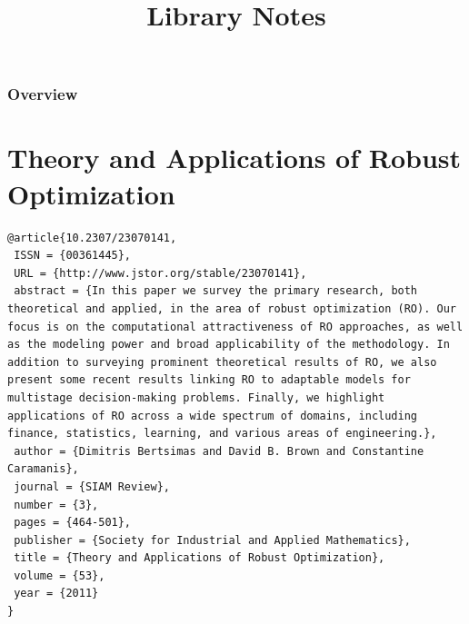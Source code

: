 \documentclass{beamer}
\title[Short title]{Library Notes}
\begin{document}
\begin{frame}
\titlepage
\end{frame}

\begin{frame}
\frametitle{Overview}
\tableofcontents
\end{frame}


\section{Theory and Applications of Robust Optimization}

\begin{frame}[fragile]
\begin{verbatim}
@article{10.2307/23070141,
 ISSN = {00361445},
 URL = {http://www.jstor.org/stable/23070141},
 abstract = {In this paper we survey the primary research, both theoretical and applied, in the area of robust optimization (RO). Our focus is on the computational attractiveness of RO approaches, as well as the modeling power and broad applicability of the methodology. In addition to surveying prominent theoretical results of RO, we also present some recent results linking RO to adaptable models for multistage decision-making problems. Finally, we highlight applications of RO across a wide spectrum of domains, including finance, statistics, learning, and various areas of engineering.},
 author = {Dimitris Bertsimas and David B. Brown and Constantine Caramanis},
 journal = {SIAM Review},
 number = {3},
 pages = {464-501},
 publisher = {Society for Industrial and Applied Mathematics},
 title = {Theory and Applications of Robust Optimization},
 volume = {53},
 year = {2011}
}
\end{verbatim}
\end{frame}

\end{document}
